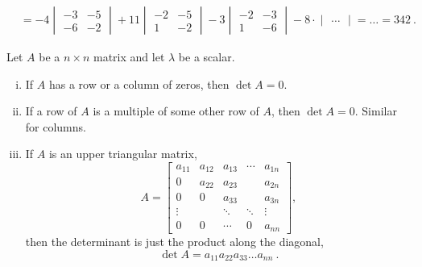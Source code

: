 \begin{example}
\begin{enumerate}[(i)]
\begin{equation*}
\begin{split}
& = -4\begin{vmatrix} -3 & -5 \\ -6 & -2 \end{vmatrix} 
+11\begin{vmatrix} -2 & -5 \\ 1 & -2 \end{vmatrix}
-3\begin{vmatrix} -2 & -3 \\ 1 & -6 \end{vmatrix}
-8\cdot\begin{vmatrix} \ldots \end{vmatrix} = \ldots = 342 \:.  
\end{split}
\end{equation*}
\end{enumerate}
\end{example}

\begin{properties}
	\label{prop:det}
	Let $A$ be a $n \times n$ matrix and let $\lambda$ be a scalar.
	\begin{enumerate}[(i)]
		\item If $A$ has a row or a column of zeros, then $\det A=0$.
		\item If a row of $A$ is a multiple of some other row of $A$, then $\det A =0$. Similar for columns.
		\item If $A$ is an upper triangular matrix,
		\[ A = \begin{bmatrix} 
		a_{11} & a_{12} & a_{13} & \cdots & a_{1n}\\
		0      & a_{22} & a_{23} &        & a_{2n}\\
		0      & 0      & a_{33} &        & a_{3n}\\
		\vdots &        & \ddots & \ddots &\vdots \\
		0      & 0      & \cdots & 0 & a_{nn} 
		\end{bmatrix}, \]
		then the determinant is just the product along the diagonal, 
		\[ \det A = a_{11} a_{22} a_{33} \dots a_{nn} \:. \]
	\end{enumerate}
\end{properties}

